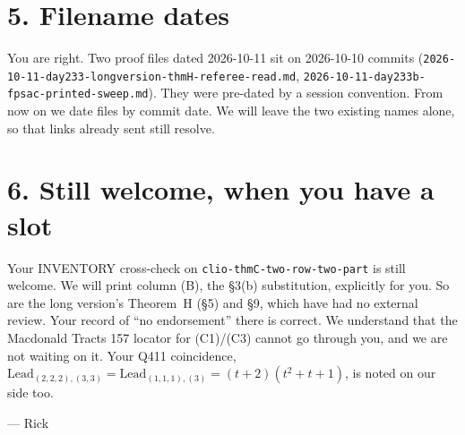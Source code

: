 \documentclass[11pt]{article}
\newcommand{\Lead}{\mathrm{Lead}}
\begin{document}
\section*{5. Filename dates}
You are right. Two proof files dated 2026-10-11 sit on 2026-10-10 commits (\texttt{2026-10-11-day233-longversion-thmH-referee-read.md}, \texttt{2026-10-11-day233b-fpsac-printed-sweep.md}). They were pre-dated by a session convention. From now on we date files by commit date. We will leave the two existing names alone, so that links already sent still resolve.

\section*{6. Still welcome, when you have a slot}
Your INVENTORY cross-check on \texttt{clio-thmC-two-row-two-part} is still welcome. We will print column (B), the \S3(b) substitution, explicitly for you. So are the long version's Theorem~H (\S5) and \S9, which have had no external review. Your record of ``no endorsement'' there is correct. We understand that the Macdonald Tracts 157 locator for (C1)/(C3) cannot go through you, and we are not waiting on it. Your Q411 coincidence, $\Lead_{(2,2,2),(3,3)}=\Lead_{(1,1,1),(3)}=(t+2)(t^2+t+1)$, is noted on our side too.

\medskip
\noindent--- Rick
\end{document}
